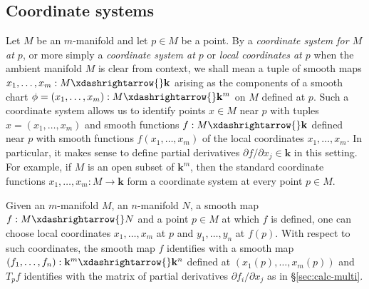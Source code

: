 \documentclass[reqno]{amsart} 
\begin{document}
\subsection{Coordinate systems}
\label{sec:org9cf6a98}
Let $M$ be an $m$-manifold
and let $p \in M$ be a point.
By a \emph{coordinate system for $M$ at $p$},
or more simply
a \emph{coordinate system at $p$} or  \emph{local coordinates at $p$}
when the ambient manifold $M$ is clear from context,
we shall mean a tuple of 
smooth maps $x_1,\dotsc,x_m : M \xdashrightarrow{} \mathbf{k}$
arising as the components
of a smooth chart $\phi = (x_1,\dotsc,x_m) : M \xdashrightarrow{} \mathbf{k}^m$
on $M$ defined at $p$.
Such a coordinate system allows us to identify points $x \in M$
near $p$ with tuples $x = (x_1,\dotsc,x_m)$
and smooth functions
$f : M \xdashrightarrow{} \mathbf{k}$
defined near $p$ with smooth functions $f(x_1,\dotsc,x_m)$ of 
the local coordinates
$x_1,\dotsc,x_m$.
In particular, it makes sense
to define partial derivatives
$\partial f /\partial x_j \in \mathbf{k}$
in this setting.
For example, if $M$ is an open subset of $\mathbf{k}^m$,
then the standard coordinate functions $x_1,\dotsc,x_m : M
\rightarrow \mathbf{k}$
form a coordinate system at every point $p \in M$.

Given an $m$-manifold $M$,
an $n$-manifold $N$,
a smooth map $f : M \xdashrightarrow{} N$
and a point $p \in M$
at which $f$ is defined,
one can choose local coordinates
$x_1,\dotsc,x_m$ at $p$
and
$y_1,\dotsc,y_n$ at $f(p)$.
With respect to such coordinates,
the smooth map $f$ identifies
with a smooth map
$(f_1,\dotsc,f_n) : \mathbf{k}^m \xdashrightarrow{} \mathbf{k}^n$
defined at $(x_1(p),\dotsc,x_m(p))$
and $T_p f$ identifies 
with the matrix of partial derivatives
$\partial f_i/ \partial x_j$
as in \S\ref{sec:calc-multi}.


\end{document}
